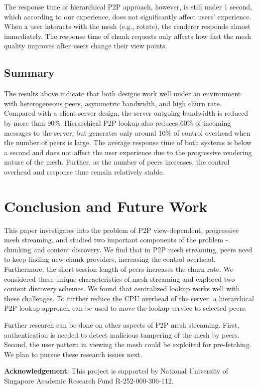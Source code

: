     The response time of hierarchical P2P approach, however, is still
    under 1 second, which according to our experience, does not
    significantly affect users' experience.  When a user interacts with
    the mesh (e.g., rotate), the renderer responds almost immediately. 
    The response time of chunk requests only affects how fast the 
    mesh quality improves after users change their view points.
    
    
    

    \subsection{Summary}
    The results above indicate that
    both designs work well under an environment with heterogeneous peers, 
    asymmetric bandwidth, and high churn rate. Compared with a
    client-server design, the server outgoing bandwidth 
    is reduced by more than 90\%.  Hierarchical P2P
    lookup also reduces 60\% of incoming messages to the server,
    but generates  
    only around 10\% of control overhead when the number of peers is large. 
    The average response time of both systems is below 
    a second and does not affect the user experience due to the
    progressive rendering nature of the mesh.   
    Further, as the number of peers
    increases, the control overhead and response time remain
    relatively stable.

\section{Conclusion and Future Work}
\label{s:conclude}
This paper investigates into the problem of P2P view-dependent,
progressive mesh streaming, and studied two important components of
the problem - chunking and content discovery. We find that in P2P mesh
streaming, peers need to keep finding new chunk providers, increasing
the control overhead. Furthermore, the short session length of peers
increases the churn rate. We considered these unique characteristics
of mesh streaming and explored two content discovery schemes. We found
that centralized lookup works well with these challenges. To further
reduce the CPU overhead of the server, a hierarchical P2P lookup
approach can be used to move the lookup service to selected peers.

Further research can be done on other aspects of P2P mesh streaming. 
First, authentication is needed to detect malicious tampering of the
mesh by peers. Second, the user pattern in viewing the mesh could be
exploited for pre-fetching. We plan to pursue these research issues
next.

\textbf{Acknowledgement}:
This project is supported by National University of Singapore Academic
Research Fund R-252-000-306-112.

